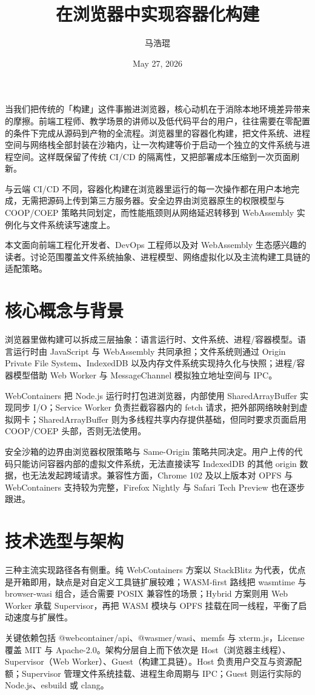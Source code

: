 \title{在浏览器中实现容器化构建}
\author{马浩琨}
\date{May 27, 2026}
\maketitle
当我们把传统的「构建」这件事搬进浏览器，核心动机在于消除本地环境差异带来的摩擦。前端工程师、教学场景的讲师以及低代码平台的用户，往往需要在零配置的条件下完成从源码到产物的全流程。浏览器里的容器化构建，把文件系统、进程空间与网络栈全部封装在沙箱内，让一次构建等价于启动一个独立的文件系统与进程空间。这样既保留了传统 CI/CD 的隔离性，又把部署成本压缩到一次页面刷新。\par
与云端 CI/CD 不同，容器化构建在浏览器里运行的每一次操作都在用户本地完成，无需把源码上传到第三方服务器。安全边界由浏览器原生的权限模型与 COOP/COEP 策略共同划定，而性能瓶颈则从网络延迟转移到 WebAssembly 实例化与文件系统读写速度上。\par
本文面向前端工程化开发者、DevOps 工程师以及对 WebAssembly 生态感兴趣的读者。讨论范围覆盖文件系统抽象、进程模型、网络虚拟化以及主流构建工具链的适配策略。\par
\chapter{核心概念与背景}
浏览器里做构建可以拆成三层抽象：语言运行时、文件系统、进程/容器模型。语言运行时由 JavaScript 与 WebAssembly 共同承担；文件系统则通过 Origin Private File System、IndexedDB 以及内存文件系统实现持久化与快照；进程/容器模型借助 Web Worker 与 MessageChannel 模拟独立地址空间与 IPC。\par
WebContainers 把 Node.js 运行时打包进浏览器，内部使用 SharedArrayBuffer 实现同步 I/O；Service Worker 负责拦截容器内的 fetch 请求，把外部网络映射到虚拟网卡；SharedArrayBuffer 则为多线程共享内存提供基础，但同时要求页面启用 COOP/COEP 头部，否则无法使用。\par
安全沙箱的边界由浏览器权限策略与 Same-Origin 策略共同决定。用户上传的代码只能访问容器内部的虚拟文件系统，无法直接读写 IndexedDB 的其他 origin 数据，也无法发起跨域请求。兼容性方面，Chrome 102 及以上版本对 OPFS 与 WebContainers 支持较为完整，Firefox Nightly 与 Safari Tech Preview 也在逐步跟进。\par
\chapter{技术选型与架构}
三种主流实现路径各有侧重。纯 WebContainers 方案以 StackBlitz 为代表，优点是开箱即用，缺点是对自定义工具链扩展较难；WASM-first 路线把 wasmtime 与 browser-wasi 组合，适合需要 POSIX 兼容性的场景；Hybrid 方案则用 Web Worker 承载 Supervisor，再把 WASM 模块与 OPFS 挂载在同一线程，平衡了启动速度与扩展性。\par
关键依赖包括 @webcontainer/api、@wasmer/wasi、memfs 与 xterm.js，License 覆盖 MIT 与 Apache-2.0。架构分层自上而下依次是 Host（浏览器主线程）、Supervisor（Web Worker）、Guest（构建工具链）。Host 负责用户交互与资源配额；Supervisor 管理文件系统挂载、进程生命周期与 IPC；Guest 则运行实际的 Node.js、esbuild 或 clang。\par
